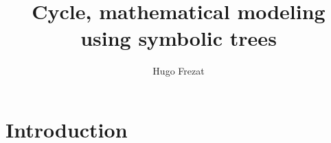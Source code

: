 \documentclass[12pt]{report}
\title{Cycle, mathematical modeling using symbolic trees}
\author{Hugo Frezat}
\begin{document}
\maketitle
	
\section{Introduction}
\end{document}

